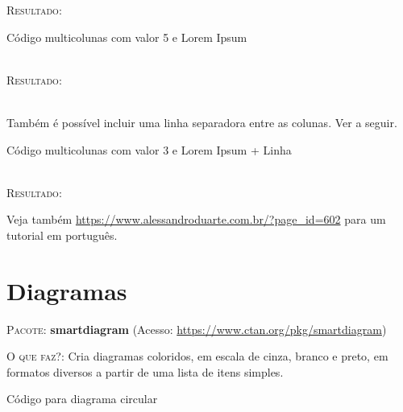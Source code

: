 \documentclass[a4paper,12pt,oneside,openright,extrafontsizes,openbib]{memoir}
\begin{document}
{\textsc{Resultado}:
\ \\

\begin{multicols}{3}
	\lipsum[2]
\end{multicols}

\begin{codex}{Código multicolunas com valor 5 e Lorem Ipsum}
\begin{multicols}{5}
\lipsum[2]
\end{multicols}
\end{codex}
\ \\

\textsc{Resultado}:

\begin{multicols}{5}
	\lipsum[2]
\end{multicols}
\ \\
Também é possível incluir uma linha separadora entre as colunas. Ver a seguir.
\ \\

\begin{codex}{Código multicolunas com valor 3 e Lorem Ipsum + Linha}
\begin{multicols}{3}
\setlength{\columnseprule}{0.2pt}
\lipsum[2]
\end{multicols}
\end{codex}
\ \\

\textsc{Resultado}:

\begin{multicols}{3}
	\setlength{\columnseprule}{0.2pt}
	\lipsum[2]
\end{multicols}

Veja também \url{https://www.alessandroduarte.com.br/?page_id=602} para um tutorial em português.
\chapter{Diagramas}

\textsc{Pacote:} \textbf{smartdiagram} (Acesso: \url{https://www.ctan.org/pkg/smartdiagram})

\textsc{O que faz?}: Cria diagramas coloridos, em escala de cinza, branco e preto, em formatos diversos a partir de uma lista de itens simples.
\ \\

\begin{codex}{Código para diagrama circular}
\begin{center}
\end{center}	
\end{codex}
\ \\

}
\end{document}
